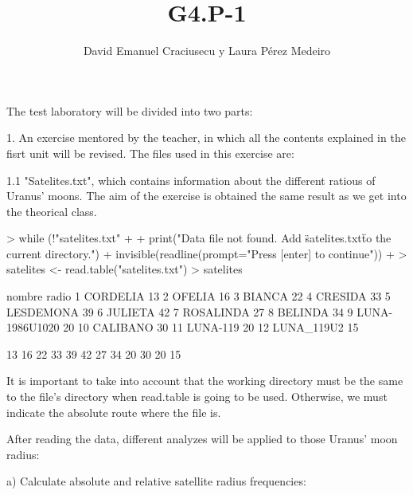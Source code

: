 \documentclass[a4paper]{article}
\title{G4.P-1}
\author{David Emanuel Craciusecu y Laura Pérez Medeiro}
\begin{document}
\maketitle
The test laboratory will be divided into two parts:

1. An exercise mentored by the teacher, in which all the contents explained
in the fisrt unit will be revised. The files used in this exercise are:

	1.1 "Satelites.txt", which contains information about the different ratious of Uranus' moons.
	The aim of the exercise is obtained the same result as we get into the theorical class. 
	
\begin{Schunk}
\begin{Sinput}
> while (!"satelites.txt" %in% list.files(getwd()))
+ {
+   print("Data file not found. Add \"satelites.txt\" to the current directory.")
+   invisible(readline(prompt="Press [enter] to continue"))
+ }
> 	satelites <- read.table("satelites.txt")
> 	satelites
\end{Sinput}
\begin{Soutput}
           nombre radio
1        CORDELIA    13
2          OFELIA    16
3          BIANCA    22
4         CRESIDA    33
5       LESDEMONA    39
6         JULIETA    42
7       ROSALINDA    27
8         BELINDA    34
9  LUNA-1986U1020    20
10       CALIBANO    30
11       LUNA-119    20
12     LUNA_119U2    15
\end{Soutput}
\begin{Soutput}
 [1] 13 16 22 33 39 42 27 34 20 30 20 15
\end{Soutput}
\end{Schunk}

It is important to take into account that the working directory must be the same to the file's
directory when read.table is going to be used. Otherwise, we must indicate the absolute route where
the file is.
	
After reading the data, different analyzes will be applied to those Uranus' moon radius:
	
		a) Calculate absolute and relative satellite radius frequencies:
\end{document}
